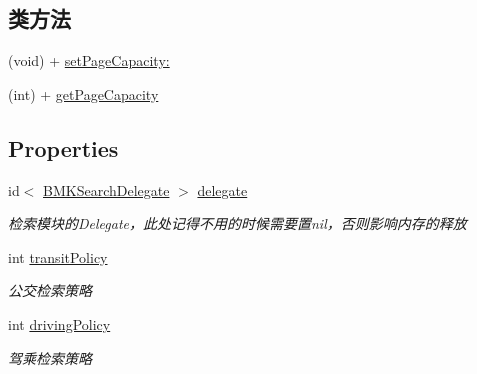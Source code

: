 \subsection*{类方法}
\begin{DoxyCompactItemize}
\item 
(void) + \hyperlink{interface_b_m_k_search_a18442a7afac76b21535d175189b7d2ec}{set\-Page\-Capacity\-:}
\item 
(int) + \hyperlink{interface_b_m_k_search_a21e67fb54e22bfdca495490f3bfa731d}{get\-Page\-Capacity}
\end{DoxyCompactItemize}
\subsection*{Properties}
\begin{DoxyCompactItemize}
\item 
\hypertarget{interface_b_m_k_search_ad3b8fc2fe55c02166fb2a7953cdbc8d7}{id$<$ \hyperlink{protocol_b_m_k_search_delegate-p}{B\-M\-K\-Search\-Delegate} $>$ \hyperlink{interface_b_m_k_search_ad3b8fc2fe55c02166fb2a7953cdbc8d7}{delegate}}\label{interface_b_m_k_search_ad3b8fc2fe55c02166fb2a7953cdbc8d7}

\begin{DoxyCompactList}\small\item\em 检索模块的\-Delegate，此处记得不用的时候需要置nil，否则影响内存的释放 \end{DoxyCompactList}\item 
\hypertarget{interface_b_m_k_search_a070e0b90d93a92c1642e9390af7164ed}{int \hyperlink{interface_b_m_k_search_a070e0b90d93a92c1642e9390af7164ed}{transit\-Policy}}\label{interface_b_m_k_search_a070e0b90d93a92c1642e9390af7164ed}

\begin{DoxyCompactList}\small\item\em 公交检索策略 \end{DoxyCompactList}\item 
\hypertarget{interface_b_m_k_search_a7bbc7acb0020ab8d5d600ce423805606}{int \hyperlink{interface_b_m_k_search_a7bbc7acb0020ab8d5d600ce423805606}{driving\-Policy}}\label{interface_b_m_k_search_a7bbc7acb0020ab8d5d600ce423805606}

\begin{DoxyCompactList}\small\item\em 驾乘检索策略 \end{DoxyCompactList}\end{DoxyCompactItemize}


